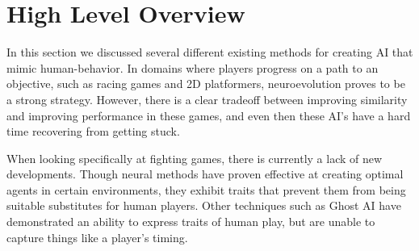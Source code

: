 \section{High Level Overview}
In this section we discussed several different existing methods for creating AI that mimic human-behavior. In domains where players progress on a path to an objective, such as racing games and 2D platformers, neuroevolution proves to be a strong strategy. However, there is a clear tradeoff between improving similarity and improving performance in these games, and even then these AI's have a hard time recovering from getting stuck. 

When looking specifically at fighting games, there is currently a lack of new developments. Though neural methods have proven effective at creating optimal agents in certain environments, they exhibit traits that prevent them from being suitable substitutes for human players. Other techniques such as Ghost AI have demonstrated an ability to express traits of human play, but are unable to capture things like a player's timing. 